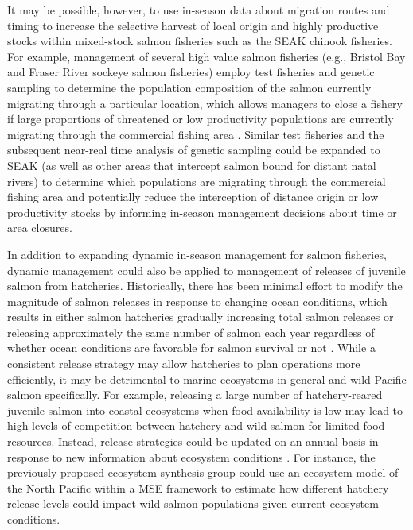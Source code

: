 It may be possible, however, to use in-season data about migration routes and
timing to increase the selective harvest of local origin and highly productive
stocks within mixed-stock salmon fisheries such as the SEAK chinook fisheries.
For example, management of several high value salmon fisheries (e.g., Bristol
Bay and Fraser River sockeye salmon fisheries) employ test fisheries and genetic
sampling to determine the population composition of the salmon currently
migrating through a particular location, which allows managers to close a
fishery if large proportions of threatened or low productivity populations are
currently migrating through the commercial fishing area \citep{Dann2013}.
Similar test fisheries and the subsequent near-real time analysis of genetic
sampling could be expanded to SEAK (as well as other areas that intercept salmon
bound for distant natal rivers) to determine which populations are migrating
through the commercial fishing area and potentially reduce the interception of
distance origin or low productivity stocks by informing in-season management
decisions about time or area closures.

In addition to expanding dynamic in-season management for salmon fisheries,
dynamic management could also be applied to management of releases of juvenile
salmon from hatcheries. Historically, there has been minimal effort to modify
the magnitude of salmon releases in response to changing ocean conditions, which
results in either salmon hatcheries gradually increasing total salmon releases
or releasing approximately the same number of salmon each year regardless of
whether ocean conditions are favorable for salmon survival or not
\citep{Pearsons2010a}. While a consistent release strategy may allow hatcheries
to plan operations more efficiently, it may be detrimental to marine ecosystems
in general and wild Pacific salmon specifically. For example, releasing a large
number of hatchery-reared juvenile salmon into coastal ecosystems when food
availability is low may lead to high levels of competition between hatchery and
wild salmon for limited food resources. Instead, release strategies could be
updated on an annual basis in response to new information about ecosystem
conditions \citep{Pearsons2010a, Peterman1983a}. For instance, the previously
proposed ecosystem synthesis group could use an ecosystem model of the North
Pacific within a MSE framework to estimate how different hatchery release levels
could impact wild salmon populations given current ecosystem conditions.



